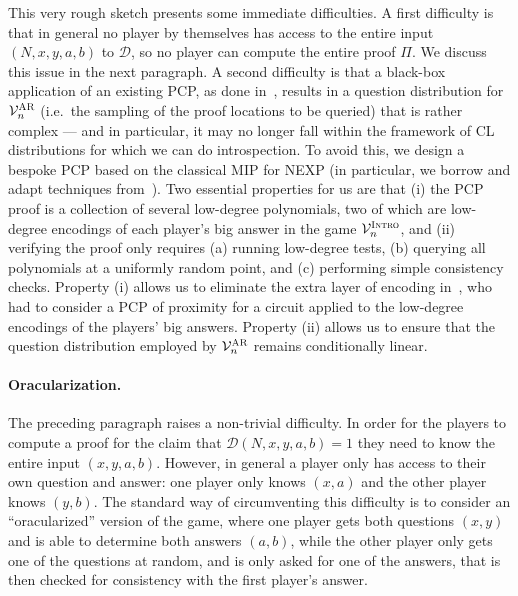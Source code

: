 \documentclass[11pt]{article}
\theoremstyle{definition}
\newcommand{\decider}{\mathcal{D}}
\newcommand{\verifier}{\mathcal{V}}
\newcommand{\gamestyle}[1]{\ensuremath{\textsc{#1}}\xspace}
\newcommand{\ar}{\gamestyle{AR}}
\newcommand{\intro}{\gamestyle{Intro}}
\begin{document}
This very rough sketch presents some immediate difficulties. A first difficulty is that in general no player by themselves has access to the entire input $(N,x,y,a,b)$ to $\decider$, so no player can compute the entire proof $\Pi$. We discuss this issue in the next paragraph. A second difficulty is that a black-box application of an existing PCP, as done in~\cite{NW19}, results in a question distribution for $\verifier_n^\ar$ (i.e.\ the sampling of the proof locations to be queried) that is rather complex --- and in particular, it may no longer fall within the framework of CL distributions for which we can do introspection. 
To avoid this, we design a bespoke PCP based on the classical MIP for NEXP (in particular, we borrow and adapt techniques from~\cite{ben2005simple,ben2006robust}). Two essential properties for us are that (i) the PCP proof is a collection of several low-degree polynomials,
    two of which are low-degree encodings of each player's big answer in the game $\verifier^\intro_n$, and (ii) verifying the proof only requires (a) running low-degree tests, (b) querying all polynomials at a uniformly random point, and (c) performing simple consistency checks. Property (i) allows us to eliminate the extra layer of encoding in~\cite{NW19}, who had to consider a PCP of proximity for a circuit applied to the
low-degree encodings of the players' big answers. Property (ii) allows us to ensure that the question distribution employed by $\verifier_n^\ar$ remains conditionally linear. 

\paragraph{Oracularization.}
The preceding paragraph raises a non-trivial difficulty. In order for the players to compute a proof for the claim that $\decider(N,x,y,a,b)=1$ they need to know the entire input $(x,y,a,b)$. However, in general a player only has access to their own question and answer: one player only knows $(x,a)$ and the other player knows $(y,b)$. The standard way of circumventing this difficulty is to consider an ``oracularized'' version of the game, where one player gets both questions $(x,y)$ and is able to determine both answers $(a,b)$, while the other player only gets one of the questions at random, and is only asked for one of the answers, that is then checked for consistency with the first player's answer. 
\end{document}
